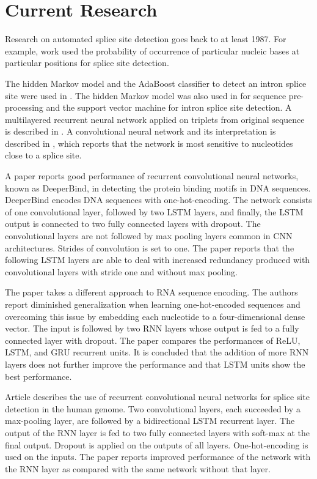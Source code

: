 \chapter{\label{ch:current-research}Current Research}

\minitoc

Research on automated splice site detection goes back to at least 1987. For
example, work \cite{shapiro1987rna} used the probability of occurrence of
particular nucleic bases at particular positions for splice site detection.

The hidden Markov model and the AdaBoost classifier to detect an intron splice
site were used in \cite{pashaei2016novel}. The hidden Markov model was also
used in \cite{goel2015improved} for sequence pre-processing and the support
vector machine for intron splice site detection. A multilayered recurrent
neural network applied on triplets from original sequence is described in
\cite{sarkar2019splice}. A convolutional neural network and its interpretation
is described in \cite{zuallaert2018splicerover}, which reports that the network
is most sensitive to nucleotides close to a splice site.

A paper \cite{hassanzadeh2016deeperbind} reports good performance of recurrent
convolutional neural networks, known as DeeperBind, in detecting the protein
binding motifs in DNA sequences. DeeperBind encodes DNA sequences with
one-hot-encoding. The network consists of one convolutional layer, followed by
two LSTM layers, and finally, the LSTM output is connected to two fully
connected layers with dropout. The convolutional layers are not followed by max
pooling layers common in CNN architectures. Strides of convolution is set to
one. The paper reports that the following LSTM layers are able to deal with
increased redundancy produced with convolutional layers with stride one and
without max pooling.

The paper \cite{lee2015dna} takes a different approach to RNA sequence
encoding. The authors report diminished generalization when learning
one-hot-encoded sequences and overcoming this issue by embedding each
nucleotide to a four-dimensional dense vector. The input is followed by two RNN
layers whose output is fed to a fully connected layer with dropout. The paper
compares the performances of ReLU, LSTM, and GRU recurrent units. It is
concluded that the addition of more RNN layers does not further improve the
performance and that LSTM units show the best performance.

Article \cite{naito2018human} describes the use of recurrent convolutional
neural networks for splice site detection in the human genome. Two
convolutional layers, each succeeded by a max-pooling layer, are followed by a
bidirectional LSTM recurrent layer. The output of the RNN layer is fed to two
fully connected layers with soft-max at the final output. Dropout is applied on
the outputs of all layers. One-hot-encoding is used on the inputs. The paper
reports improved performance of the network with the RNN layer as compared with
the same network without that layer.

